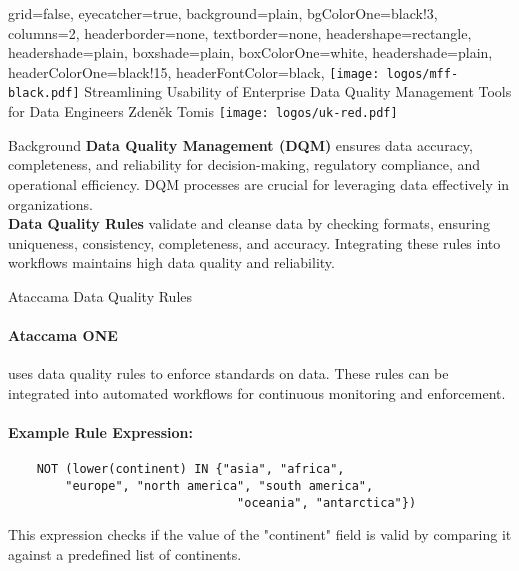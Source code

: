\documentclass[portrait,a0paper,fontscale=0.25]{baposter}
\begin{document}
\color{black!80} %
\begin{poster}{grid=false,
	eyecatcher=true,
	background=plain,
	bgColorOne=black!3, %
	columns=2,
	headerborder=none,
	textborder=none,
	headershape=rectangle,
	headershade=plain,
	boxshade=plain,
	boxColorOne=white,
	headershade=plain,
	headerColorOne=black!15, %
	headerFontColor=black,
	}%
	{\texttt{[image: logos/mff-black.pdf]}}
	{\LARGE Streamlining Usability of Enterprise
	Data Quality Management Tools for
	Data Engineers}
	{\vspace{1ex} Zdeněk Tomis}
	{\texttt{[image: logos/uk-red.pdf]}}


%
%

\begin{posterbox}[name=background,column=0]{Background}
	\textbf{Data Quality Management (DQM)} ensures data accuracy, completeness, and reliability for decision-making, regulatory compliance, and operational efficiency. DQM processes are crucial for leveraging data effectively in organizations. \\

    \vspace{0.5em}
    \textbf{Data Quality Rules} validate and cleanse data by checking formats, ensuring uniqueness, consistency, completeness, and accuracy. Integrating these rules into workflows maintains high data quality and reliability.
\end{posterbox}

\begin{posterbox}[column=0, name=ata, below=background]{Ataccama Data Quality Rules}

	\paragraph{Ataccama ONE} uses data quality rules to enforce standards on data. These rules can be integrated into automated workflows for continuous monitoring and enforcement. \\
	\paragraph{Example Rule Expression:}
	\begin{verbatim}
	NOT (lower(continent) IN {"asia", "africa", 
		"europe", "north america", "south america", 
								"oceania", "antarctica"})
	\end{verbatim}
	This expression checks if the value of the "continent" field is valid by comparing it against a predefined list of continents.
	

\end{posterbox}
\end{poster}
\end{document}
